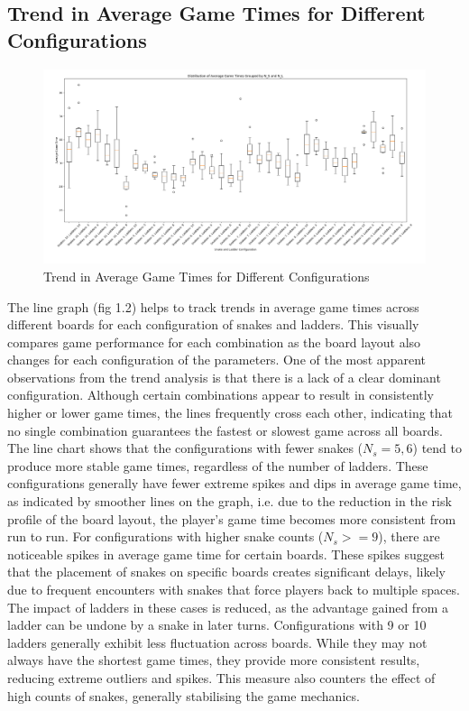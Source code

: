 \documentclass[12pt]{report}
\begin{document}
	\subsection{Trend in Average Game Times for Different Configurations}
	\begin{figure}[h]
		\centering
		\includegraphics[width=0.8\linewidth]{BoxPlots}
		\caption{Trend in Average Game Times for Different Configurations}
		\label{fig:boxplots}
	\end{figure}
	The line graph (fig 1.2) helps to track trends in average game times across different boards for each configuration of snakes and ladders. This visually compares game performance for each combination as the board layout also changes for each configuration of the parameters. One of the most apparent observations from the trend analysis is that there is a lack of a clear dominant configuration. Although certain combinations appear to result in consistently higher or lower game times, the lines frequently cross each other, indicating that no single combination guarantees the fastest or slowest game across all boards. The line chart shows that the configurations with fewer snakes ($N_{s} = 5, 6$) tend to produce more stable game times, regardless of the number of ladders. These configurations generally have fewer extreme spikes and dips in average game time, as indicated by smoother lines on the graph, i.e. due to the reduction in the risk profile of the board layout, the player’s game time becomes more consistent from run to run. For configurations with higher snake counts ($N_{s} >= 9$), there are noticeable spikes in average game time for certain boards. These spikes suggest that the placement of snakes on specific boards creates significant delays, likely due to frequent encounters with snakes that force players back to multiple spaces. The impact of ladders in these cases is reduced, as the advantage gained from a ladder can be undone by a snake in later turns. Configurations with 9 or 10 ladders generally exhibit less fluctuation across boards. While they may not always have the shortest game times, they provide more consistent results, reducing extreme outliers and spikes. This measure also counters the effect of high counts of snakes, generally stabilising the game mechanics.
	
\end{document}
